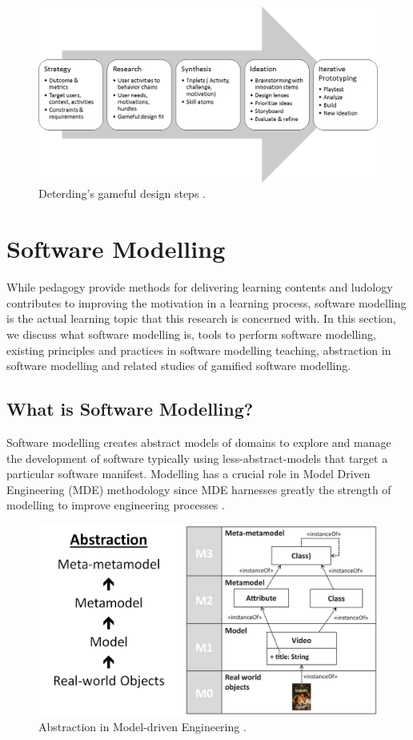 \documentclass[12pt, a4paper]{report}
\begin{document}
{\begin{figure}[ht]
\centering
\includegraphics[width=14cm]{gameful-steps}
\caption{Deterding's gameful design steps \cite{deterding2015lens}.}
\label{fig:gameful-steps}
\end{figure}


\section{Software Modelling}
While pedagogy provide methods for delivering learning contents and ludology contributes to improving the motivation in a learning process, software modelling is the actual learning topic that this research is concerned with. In this section, we discuss what software modelling is, tools to perform software modelling, existing principles and practices in software modelling teaching, abstraction in software modelling and related studies of gamified software modelling.    

\subsection{What is Software Modelling?}
Software modelling creates abstract models of domains to explore and manage the development of software typically using less-abstract-models that target a particular software manifest. Modelling has a crucial role in Model Driven Engineering (MDE) methodology since MDE harnesses greatly the strength of modelling to improve engineering processes \cite{brambilla2012model}.  

\begin{figure}[!b]
\centering
\includegraphics[width=13cm]{abstraction}
\caption{Abstraction in Model-driven Engineering \cite{brambilla2012model}.}
\label{abstraction}
\end{figure}

}
\end{document}
